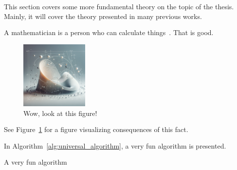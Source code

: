 This section covers some more fundamental theory on the topic of the thesis.
Mainly, it will cover the theory presented in many previous works.

A mathematician is a person who can calculate things~\parencite{wang2019cutting}.
That is good.
%
\begin{figure}[ht]
    \centering
    \includegraphics[width=0.3\textwidth]{src/figures/figure}
    \caption{Wow, look at this figure!}
    \label{fig:fun_figure}
\end{figure}
%
See Figure~\ref{fig:fun_figure} for a figure visualizing consequences of this fact.

In Algorithm~\ref{alg:universal_algorithm}, a very fun algorithm is presented.
%
\begin{algorithm}
    \caption{A very fun algorithm}
    \label{alg:universal_algorithm}
    
\end{algorithm}


